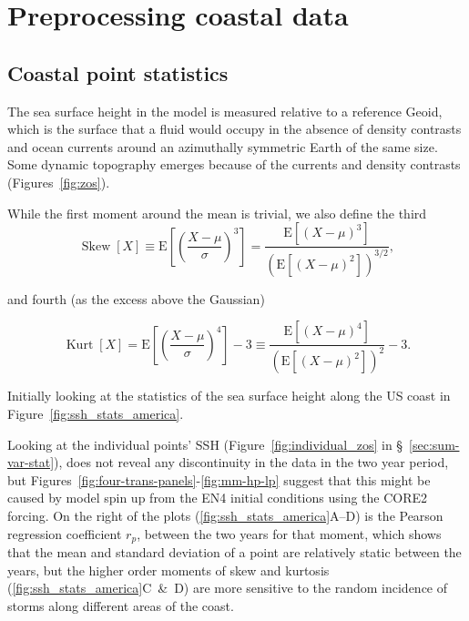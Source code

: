 \section{Preprocessing coastal data}
\subsection{Coastal point statistics}
The sea surface height in the model is measured relative to
a reference Geoid, which is the surface that a fluid would occupy
in the absence of density contrasts and ocean currents around an
azimuthally symmetric Earth of the same size.
Some dynamic topography emerges because of the
currents and density contrasts (Figures~\ref{fig:zos}).




While the first moment around the mean is trivial, we also define the third
\begin{equation}
\operatorname{Skew}[X]\equiv \mathrm{E}\left[\left(\frac{X-\mu}{\sigma}\right)^{3}\right]
=\frac{\mathrm{E}\left[(X-\mu)^{3}\right]}{\left(\mathrm{E}\left[(X-\mu)^{2}\right]\right)^{3 / 2}},
\end{equation}

and fourth (as the excess above the Gaussian)~\cite{taleb2019statistical}

\begin{equation}
\operatorname{Kurt}[X]=
\mathrm{E}\left[\left(\frac{X-\mu}{\sigma}\right)^{4}\right]-3
\equiv \frac{\mathrm{E}\left[(X-\mu)^{4}\right]}{\left(\mathrm{E}\left[(X-\mu)^{2}\right]\right)^{2}}-3.
\end{equation}


Initially looking at the statistics of the sea surface height along the
US coast in Figure~\ref{fig:ssh_stats_america}.




Looking at the individual points' SSH (Figure~\ref{fig:individual_zos} in §~\ref{sec:sum-var-stat}),
does not reveal any discontinuity in the data in the two year period,
 but Figures~\ref{fig:four-trans-panels}-\ref{fig:mm-hp-lp}
suggest that this might be caused by model spin up from the
EN4 initial conditions using the CORE2 forcing.
On the right of the plots (\ref{fig:ssh_stats_america}A--D) is the Pearson regression coefficient $r_p$,
between the two years for that moment, which shows that the mean and
standard deviation of a point are relatively static between the years, but the
higher order moments of skew and kurtosis (\ref{fig:ssh_stats_america}C~\&~D) are more sensitive to the
random incidence of storms along different areas of the coast.




